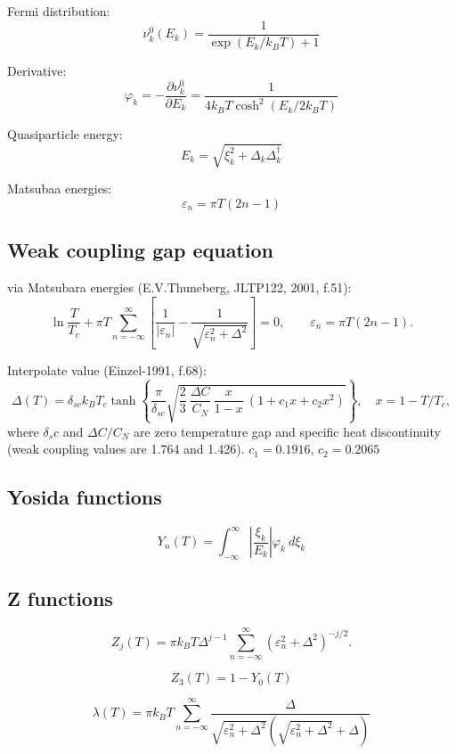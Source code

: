 \documentclass[a4paper]{article}
\begin{document}
\def\en{\varepsilon_n}
\def\sumii{\sum_{n=-\infty}^{\infty}}
\def\intii{\int_{-\infty}^{\infty}}

\subsection*{}

Fermi distribution:
$$
\nu_k^0(E_k) = \frac1{\exp(E_k/k_BT) + 1}
$$

Derivative:
$$
\varphi_k
= -\frac{\partial \nu_k^0}{\partial E_k}
= \frac1{4k_BT \cosh^2(E_k/2k_BT)}
$$

Quasiparticle energy:
$$
E_k = \sqrt{\xi_k^2+\Delta_k\Delta_k^\dagger}
$$

Matsubaa energies:
$$
\en=\pi T (2n-1)
$$

\subsection*{Weak coupling gap equation}

via Matsubara energies (E.V.Thuneberg, JLTP122, 2001, f.51):
$$
\ln\frac{T}{T_c} + \pi T \sumii
\left[ \frac1{|\en|} - \frac1{\sqrt{\en^2 + \Delta^2}}
\right]=0,
\qquad \en=\pi T (2n-1).
$$

Interpolate value (Einzel-1991, f.68):
$$
\Delta(T) = \delta_{sc} k_B T_c
\tanh\left\{\frac{\pi}{\delta_{sc}}\sqrt{
\frac23\ \frac{\Delta C}{C_N}\ \frac{x}{1-x}\ (1 + c_1 x + c_2 x^2)
}\right\},\quad x=1-T/T_c,
$$
where $\delta_sc$ and $\Delta C/C_N$ are zero temperature gap and specific heat discontinuity
(weak coupling values are 1.764 and 1.426). $c_1=0.1916$, $c_2=0.2065$


\subsection*{Yosida functions}

$$
Y_n(T) = \intii \left|\frac{\xi_k}{E_k}\right|\varphi_k\ d\xi_k
$$

\subsection*{Z functions}

$$
Z_j(T) = \pi k_B T \Delta^{j-1} \sumii(\en^2 + \Delta^2)^{-j/2}.
$$

$$
Z_3(T) = 1-Y_0(T)
$$

$$
\lambda(T) = \pi k_B T \sumii
\frac{\Delta}{\sqrt{\en^2 + \Delta^2}(\sqrt{\en^2 + \Delta^2} + \Delta)}
$$
\end{document}
